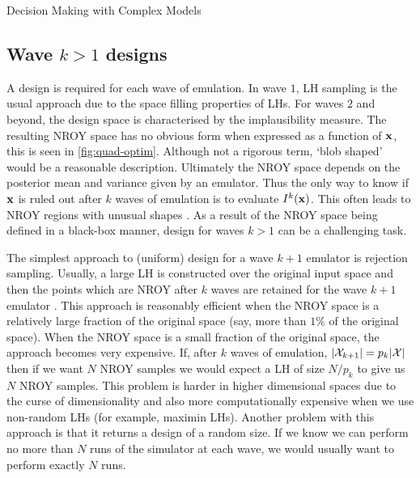 \begin{chapter}{Decision Making with Complex Models \label{Chap:optimisation}}
\subsection{Wave $k>1$ designs}

A design is required for each wave of emulation. In wave $1$, LH sampling is the usual approach due to the space filling properties of LHs. For waves $2$ and beyond, the design space is characterised by the implausibility measure. The resulting NROY space has no obvious form when expressed as a function of $\mathbf{x}$, this is seen in \cref{fig:quad-optim}. Although not a rigorous term, `blob shaped' would be a reasonable description. Ultimately the NROY space depends on the posterior mean and variance given by an emulator. Thus the only way to know if $\mathbf{x}$ is ruled out after $k$ waves of emulation is to evaluate $I^k(\mathbf{x})$. This often leads to NROY regions with unusual shapes \citep{Garbunoinigo2020}. As a result of the NROY space being defined in a black-box manner, design for waves $k>1$ can be a challenging task.

The simplest approach to (uniform) design for a wave $k+1$ emulator is rejection sampling. Usually, a large LH is constructed over the original input space and then the points which are NROY after $k$ waves are retained for the wave $k+1$ emulator \citep{Vernon2010}. This approach is reasonably efficient when the NROY space is a relatively large fraction of the original space (say, more than $1\%$ of the original space). When the NROY space is a small fraction of the original space, the approach becomes very expensive. If, after $k$ waves of emulation, $|\mathcal{X}_{k+1}| = p_k|\mathcal{X}|$ then if we want $N$ NROY samples we would expect a LH of size $N/p_k$ to give us $N$ NROY samples. This problem is harder in higher dimensional spaces due to the curse of dimensionality and also more computationally expensive when we use non-random LHs (for example, maximin LHs). Another problem with this approach is that it returns a design of a random size. If we know we can perform no more than $N$ runs of the simulator at each wave, we would usually want to perform exactly $N$ runs.


\end{chapter}
